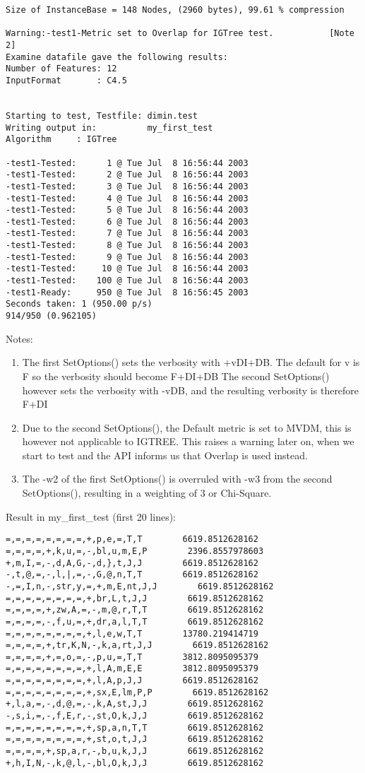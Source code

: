 \begin{verbatim}
Size of InstanceBase = 148 Nodes, (2960 bytes), 99.61 % compression

Warning:-test1-Metric set to Overlap for IGTree test.           [Note 2]
Examine datafile gave the following results:
Number of Features: 12
InputFormat       : C4.5


Starting to test, Testfile: dimin.test
Writing output in:          my_first_test
Algorithm     : IGTree

-test1-Tested:      1 @ Tue Jul  8 16:56:44 2003
-test1-Tested:      2 @ Tue Jul  8 16:56:44 2003
-test1-Tested:      3 @ Tue Jul  8 16:56:44 2003
-test1-Tested:      4 @ Tue Jul  8 16:56:44 2003
-test1-Tested:      5 @ Tue Jul  8 16:56:44 2003
-test1-Tested:      6 @ Tue Jul  8 16:56:44 2003
-test1-Tested:      7 @ Tue Jul  8 16:56:44 2003
-test1-Tested:      8 @ Tue Jul  8 16:56:44 2003
-test1-Tested:      9 @ Tue Jul  8 16:56:44 2003
-test1-Tested:     10 @ Tue Jul  8 16:56:44 2003
-test1-Tested:    100 @ Tue Jul  8 16:56:44 2003
-test1-Ready:     950 @ Tue Jul  8 16:56:45 2003
Seconds taken: 1 (950.00 p/s)
914/950 (0.962105)

\end{verbatim}

Notes:
\begin{enumerate}
\item The first SetOptions() sets the verbosity with +vDI+DB.
The default for v is F so the verbosity should become F+DI+DB
The second SetOptions() however sets the verbosity with -vDB, and the
resulting verbosity is therefore F+DI
\item Due to the second SetOptions(), the Default metric is set to
MVDM, this is however not applicable to IGTREE. This raises a warning
later on, when we start to test and the API informs us that Overlap is
used instead.
\item The -w2 of the first SetOptions() is overruled with -w3 from the
second SetOptions(), resulting in a weighting of 3 or Chi-Square.
\end{enumerate}

Result in my\_first\_test (first 20 lines):
\begin{verbatim}
=,=,=,=,=,=,=,=,+,p,e,=,T,T        6619.8512628162
=,=,=,=,+,k,u,=,-,bl,u,m,E,P        2396.8557978603
+,m,I,=,-,d,A,G,-,d,},t,J,J        6619.8512628162
-,t,@,=,-,l,|,=,-,G,@,n,T,T        6619.8512628162
-,=,I,n,-,str,y,=,+,m,E,nt,J,J        6619.8512628162
=,=,=,=,=,=,=,=,+,br,L,t,J,J        6619.8512628162
=,=,=,=,+,zw,A,=,-,m,@,r,T,T        6619.8512628162
=,=,=,=,-,f,u,=,+,dr,a,l,T,T        6619.8512628162
=,=,=,=,=,=,=,=,+,l,e,w,T,T        13780.219414719
=,=,=,=,+,tr,K,N,-,k,a,rt,J,J        6619.8512628162
=,=,=,=,+,=,o,=,-,p,u,=,T,T        3812.8095095379
=,=,=,=,=,=,=,=,+,l,A,m,E,E        3812.8095095379
=,=,=,=,=,=,=,=,+,l,A,p,J,J        6619.8512628162
=,=,=,=,=,=,=,=,+,sx,E,lm,P,P        6619.8512628162
+,l,a,=,-,d,@,=,-,k,A,st,J,J        6619.8512628162
-,s,i,=,-,f,E,r,-,st,O,k,J,J        6619.8512628162
=,=,=,=,=,=,=,=,+,sp,a,n,T,T        6619.8512628162
=,=,=,=,=,=,=,=,+,st,o,t,J,J        6619.8512628162
=,=,=,=,+,sp,a,r,-,b,u,k,J,J        6619.8512628162
+,h,I,N,-,k,@,l,-,bl,O,k,J,J        6619.8512628162
\end{verbatim}

